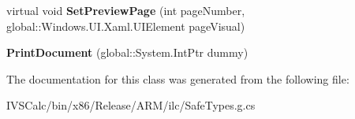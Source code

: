 \begin{DoxyCompactItemize}
\item 
\mbox{\label{class_windows_1_1_u_i_1_1_xaml_1_1_printing_1_1_print_document_a9b89dc73b3d3108f6a9a5bbda7805863}} 
virtual void {\bfseries Set\+Preview\+Page} (int page\+Number, global\+::\+Windows.\+U\+I.\+Xaml.\+U\+I\+Element page\+Visual)
\item 
\mbox{\label{class_windows_1_1_u_i_1_1_xaml_1_1_printing_1_1_print_document_ac0c6ca7b864f685e2f0989f778c41e72}} 
{\bfseries Print\+Document} (global\+::\+System.\+Int\+Ptr dummy)
\end{DoxyCompactItemize}


The documentation for this class was generated from the following file\+:\begin{DoxyCompactItemize}
\item 
I\+V\+S\+Calc/bin/x86/\+Release/\+A\+R\+M/ilc/Safe\+Types.\+g.\+cs\end{DoxyCompactItemize}
